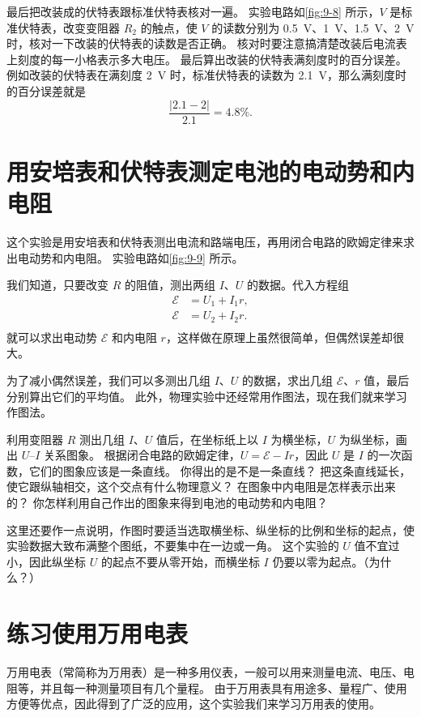 最后把改装成的伏特表跟标准伏特表核对一遍。
实验电路如\cref{fig:9-8} 所示，$V$ 是标准伏特表，改变变阻器 $R_2$ 的触点，使 $V$ 的读数分别为 \qty{0.5}{V}、\qty{1}{V}、\qty{1.5}{V}、\qty{2}{V} 时，核对一下改装的伏特表的读数是否正确。
核对时要注意搞清楚改装后电流表上刻度的每一小格表示多大电压。
最后算出改装的伏特表满刻度时的百分误差。
例如改装的伏特表在满刻度 \qty{2}{V} 时，标准伏特表的读数为 \qty{2.1}{V}，那么满刻度时的百分误差就是
\[\frac{|2.1-2|}{2.1}=4.8\%.\]

\section{用安培表和伏特表测定电池的电动势和内电阻}
这个实验是用安培表和伏特表测出电流和路端电压，再用闭合电路的欧姆定律来求出电动势和内电阻。
实验电路如\cref{fig:9-9} 所示。

我们知道，只要改变 $R$ 的阻值，测出两组 $I$、$U$ 的数据。代入方程组
\[\begin{split}
    \mathcal{E}&=U_1+I_1r,\\
    \mathcal{E}&=U_2+I_2r.\\
\end{split}\]
就可以求出电动势 $\mathcal{E}$ 和内电阻 $r$，这样做在原理上虽然很简单，但偶然误差却很大。

为了减小偶然误差，我们可以多测出几组 $I$、$U$ 的数据，求出几组 $\mathcal{E}$、$r$ 值，最后分别算出它们的平均值。
此外，物理实验中还经常用作图法，现在我们就来学习作图法。

利用变阻器 $R$ 测出几组 $I$、$U$ 值后，在坐标纸上以 $I$ 为横坐标，$U$ 为纵坐标，画出 $U$--$I$ 关系图象。
根据闭合电路的欧姆定律，$U=\mathcal{E}-Ir$，因此 $U$ 是 $I$ 的一次函数，它们的图象应该是一条直线。
你得出的是不是一条直线？
把这条直线延长，使它跟纵轴相交，这个交点有什么物理意义？
在图象中内电阻是怎样表示出来的？
你怎样利用自己作出的图象来得到电池的电动势和内电阻？

这里还要作一点说明，作图时要适当选取横坐标、纵坐标的比例和坐标的起点，使实验数据大致布满整个图纸，不要集中在一边或一角。
这个实验的 $U$ 值不宜过小，因此纵坐标 $U$ 的起点不要从零开始，而横坐标 $I$ 仍要以零为起点。（为什么？）

\section{练习使用万用电表}
万用电表（常简称为万用表）是一种多用仪表，一般可以用来测量电流、电压、电阻等，并且每一种测量项目有几个量程。
由于万用表具有用途多、量程广、使用方便等优点，因此得到了广泛的应用，这个实验我们来学习万用表的使用。

